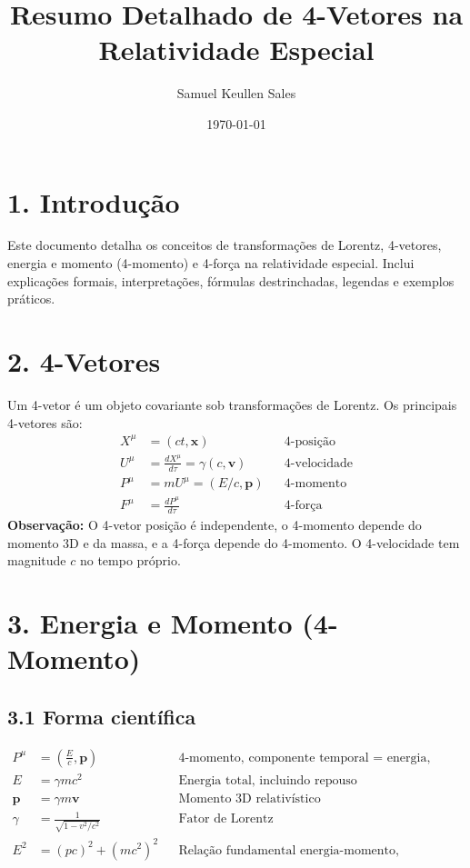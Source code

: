 \documentclass[a4paper,12pt]{article}
\title{Resumo Detalhado de 4-Vetores na Relatividade Especial}
\author{Samuel Keullen Sales}
\date{\today}
\begin{document}
\maketitle

\section*{1. Introdução}
Este documento detalha os conceitos de transformações de Lorentz, 4-vetores, energia e momento (4-momento) e 4-força na relatividade especial. Inclui explicações formais, interpretações, fórmulas destrinchadas, legendas e exemplos práticos.

\section*{2. 4-Vetores}
Um 4-vetor é um objeto covariante sob transformações de Lorentz. Os principais 4-vetores são:
\begin{align*}
X^\mu &= (ct, \mathbf{x}) && \text{4-posição}\\
U^\mu &= \frac{dX^\mu}{d\tau} = \gamma (c, \mathbf{v}) && \text{4-velocidade}\\
P^\mu &= m U^\mu = (E/c, \mathbf{p}) && \text{4-momento}\\
F^\mu &= \frac{dP^\mu}{d\tau} && \text{4-força}
\end{align*}
\textbf{Observação:} O 4-vetor posição é independente, o 4-momento depende do momento 3D e da massa, e a 4-força depende do 4-momento. O 4-velocidade tem magnitude $c$ no tempo próprio.

\section*{3. Energia e Momento (4-Momento)}
\subsection*{3.1 Forma científica}
\begin{align}
P^\mu &= \left(\frac{E}{c}, \mathbf{p}\right) && \text{4-momento, componente temporal = energia, espacial = momento}\\
E &= \gamma m c^2 && \text{Energia total, incluindo repouso}\\
\mathbf{p} &= \gamma m \mathbf{v} && \text{Momento 3D relativístico}\\
\gamma &= \frac{1}{\sqrt{1 - v^2/c^2}} && \text{Fator de Lorentz}\\
E^2 &= (pc)^2 + (mc^2)^2 && \text{Relação fundamental energia-momento, invariância relativística}
\end{align}
\end{document}
